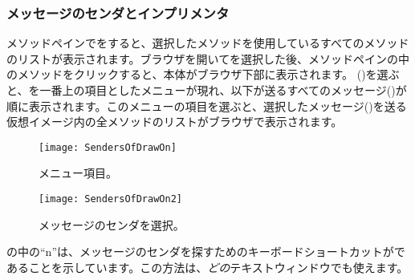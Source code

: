 \documentclass[a4paper,10pt,twoside]{book}
\begin{document}
\subsubsection{メッセージのセンダとインプリメンタ}

メソッドペインでを\actclick すると、選択したメソッドを使用しているすべてのメソッドのリストが表示されます。ブラウザを開いてを選択した後、メソッドペインの中のメソッドをクリックすると、本体がブラウザ下部に表示されます。  ()を選ぶと、を一番上の項目としたメニューが現れ、以下が送るすべてのメッセージ()が順に表示されます。このメニューの項目を選ぶと、選択したメッセージ()を送る仮想イメージ内の全メソッドのリストがブラウザで表示されます。


\begin{figure}[htb]
\centerline {\texttt{[image: SendersOfDrawOn]}}
\caption{メニュー項目。}
\end{figure}

\begin{figure}[htb]
\centerline {\texttt{[image: SendersOfDrawOn2]}}
\caption{メッセージのセンダを選択。}
\end{figure}

の中の``n''は、メッセージのセンダを探すためのキーボードショートカットがであることを示しています。この方法は、\emph{どの}テキストウィンドウでも使えます。

\end{document}
